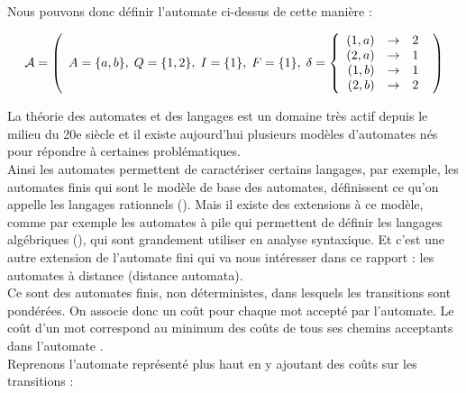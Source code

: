 \documentclass{report}
\begin{document}
Nous pouvons donc définir l'automate ci-dessus de cette manière :

\[\mathcal{A} = \left(
\begin{array}{rcr}
			A= \{a, b\},\;
			Q=\{1, 2\},\; 
			I=\{1\},\; 
			F=\{1\},\; 
			\delta=
				\left\{
					\begin{array}{rcr}
						(1,a) & \rightarrow & 2 \\
						(2,a) & \rightarrow & 1 \\
						(1,b) & \rightarrow & 1 \\
						(2,b) & \rightarrow & 2 \\
					\end{array}
				\right.
\end{array}
\right)\]

La théorie des automates et des langages est un domaine très actif depuis le milieu du 20e siècle et il existe aujourd'hui plusieurs modèles d'automates nés pour répondre à certaines problématiques. 
\\

Ainsi les automates permettent de caractériser certains langages, par exemple, les automates finis qui sont le modèle de base des automates, définissent ce qu'on appelle les langages rationnels (\cite{Elements-d-algorithmique}). Mais il existe des extensions à ce modèle, comme par exemple les automates à pile qui permettent de définir les langages algébriques (\cite{Elements-d-algorithmique}), qui sont grandement utiliser en analyse syntaxique. Et c'est une autre extension de l'automate fini qui va nous intéresser dans ce rapport : les automates à distance (distance automata).
\\
Ce sont des automates finis, non déterministes, dans lesquels les transitions sont pondérées. On associe donc un coût pour chaque mot accepté par l'automate. Le coût d'un mot correspond au minimum des coûts de tous ses chemins acceptants dans l'automate .\\

Reprenons l'automate représenté plus haut en y ajoutant des coûts sur les transitions :

\begin{center}
\end{center}
\end{document}
